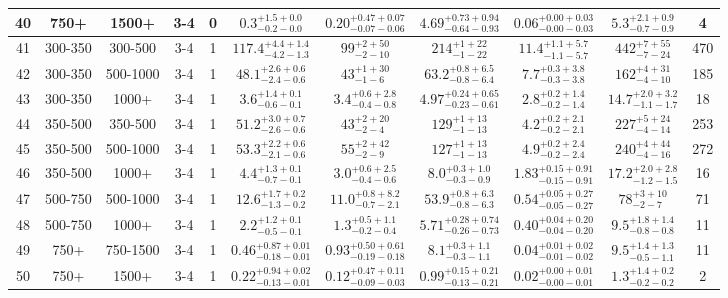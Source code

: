 \documentclass[11pt, oneside]{article}
\begin{document}
\begin{table}
{\begin{tabular}{ |c|c|c|c|c||c|c|c|c||c|c| }
40 & 750+ & 1500+ & 3-4 & 0 & $0.3^{+1.5+0.0}_{-0.2-0.0}$ & $0.20^{+0.47+0.07}_{-0.07-0.06}$ & $4.69^{+0.73+0.94}_{-0.64-0.93}$ & $0.06^{+0.00+0.03}_{-0.00-0.03}$ & $5.3^{+2.1+0.9}_{-0.7-0.9}$ & 4 \\ \hline
41 & 300-350 & 300-500 & 3-4 & 1 & $117.4^{+4.4+1.4}_{-4.2-1.3}$ & $99^{+ 2+50}_{- 2-10}$ & $214^{+ 1+22}_{- 1-22}$ & $11.4^{+1.1+5.7}_{-1.1-5.7}$ & $442^{+ 7+55}_{- 7-24}$ & 470 \\ \hline
42 & 300-350 & 500-1000 & 3-4 & 1 & $48.1^{+2.6+0.6}_{-2.4-0.6}$ & $43^{+ 1+30}_{- 1- 6}$ & $63.2^{+0.8+6.5}_{-0.8-6.4}$ & $7.7^{+0.3+3.8}_{-0.3-3.8}$ & $162^{+ 4+31}_{- 4-10}$ & 185 \\ \hline
43 & 300-350 & 1000+ & 3-4 & 1 & $3.6^{+1.4+0.1}_{-0.6-0.1}$ & $3.4^{+0.6+2.8}_{-0.4-0.8}$ & $4.97^{+0.24+0.65}_{-0.23-0.61}$ & $2.8^{+0.2+1.4}_{-0.2-1.4}$ & $14.7^{+2.0+3.2}_{-1.1-1.7}$ & 18 \\ \hline
44 & 350-500 & 350-500 & 3-4 & 1 & $51.2^{+3.0+0.7}_{-2.6-0.6}$ & $43^{+ 2+20}_{- 2- 4}$ & $129^{+ 1+13}_{- 1-13}$ & $4.2^{+0.2+2.1}_{-0.2-2.1}$ & $227^{+ 5+24}_{- 4-14}$ & 253 \\ \hline
45 & 350-500 & 500-1000 & 3-4 & 1 & $53.3^{+2.2+0.6}_{-2.1-0.6}$ & $55^{+ 2+42}_{- 2- 9}$ & $127^{+ 1+13}_{- 1-13}$ & $4.9^{+0.2+2.4}_{-0.2-2.4}$ & $240^{+ 4+44}_{- 4-16}$ & 272 \\ \hline
46 & 350-500 & 1000+ & 3-4 & 1 & $4.4^{+1.3+0.1}_{-0.7-0.1}$ & $3.0^{+0.6+2.5}_{-0.4-0.6}$ & $8.0^{+0.3+1.0}_{-0.3-0.9}$ & $1.83^{+0.15+0.91}_{-0.15-0.91}$ & $17.2^{+2.0+2.8}_{-1.2-1.5}$ & 16 \\ \hline
47 & 500-750 & 500-1000 & 3-4 & 1 & $12.6^{+1.7+0.2}_{-1.3-0.2}$ & $11.0^{+0.8+8.2}_{-0.7-2.1}$ & $53.9^{+0.8+6.3}_{-0.8-6.3}$ & $0.54^{+0.05+0.27}_{-0.05-0.27}$ & $78^{+ 3+10}_{- 2- 7}$ & 71 \\ \hline
48 & 500-750 & 1000+ & 3-4 & 1 & $2.2^{+1.2+0.1}_{-0.5-0.1}$ & $1.3^{+0.5+1.1}_{-0.2-0.4}$ & $5.71^{+0.28+0.74}_{-0.26-0.73}$ & $0.40^{+0.04+0.20}_{-0.04-0.20}$ & $9.5^{+1.8+1.4}_{-0.8-0.8}$ & 11 \\ \hline
49 & 750+ & 750-1500 & 3-4 & 1 & $0.46^{+0.87+0.01}_{-0.18-0.01}$ & $0.93^{+0.50+0.61}_{-0.19-0.18}$ & $8.1^{+0.3+1.1}_{-0.3-1.1}$ & $0.04^{+0.01+0.02}_{-0.01-0.02}$ & $9.5^{+1.4+1.3}_{-0.5-1.1}$ & 11 \\ \hline
50 & 750+ & 1500+ & 3-4 & 1 & $0.22^{+0.94+0.02}_{-0.13-0.01}$ & $0.12^{+0.47+0.11}_{-0.09-0.03}$ & $0.99^{+0.15+0.21}_{-0.13-0.21}$ & $0.02^{+0.00+0.01}_{-0.00-0.01}$ & $1.3^{+1.4+0.2}_{-0.2-0.2}$ & 2 \\ \hline

\end{tabular}}
\end{table}
\end{document}
